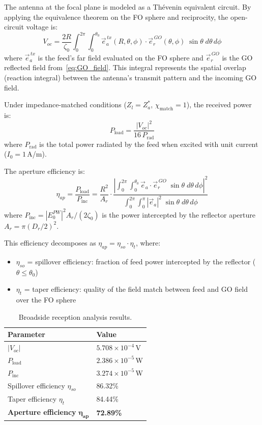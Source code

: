 \documentclass{article}
\begin{document}
The antenna at the focal plane is modeled as a Th\'{e}venin equivalent circuit. By applying the equivalence theorem on the FO sphere and reciprocity, the open-circuit voltage is:
\begin{equation}\label{eq:Voc}
V_{oc} = \frac{2R}{\zeta_0} \int_0^{2\pi}\!\int_0^{\theta_0} \vec{e}_a^{\,tx}(R,\theta,\phi) \cdot \vec{e}_r^{\,GO}(\theta,\phi)\;\sin\theta\;d\theta\,d\phi
\end{equation}
where $\vec{e}_a^{\,tx}$ is the feed's far field evaluated on the FO sphere and $\vec{e}_r^{\,GO}$ is the GO reflected field from~\eqref{eq:GO_field}. This integral represents the spatial overlap (reaction integral) between the antenna's transmit pattern and the incoming GO field.

Under impedance-matched conditions ($Z_l = Z_a^*$, $\chi_{\text{match}} = 1$), the received power is:
\begin{equation}\label{eq:Pload}
P_{\text{load}} = \frac{|V_{oc}|^2}{16\,P_{\text{rad}}}
\end{equation}
where $P_{\text{rad}}$ is the total power radiated by the feed when excited with unit current ($I_0 = 1$\,A/m).

The aperture efficiency is:
\begin{equation}\label{eq:eta_ap}
\eta_{ap} = \frac{P_{\text{load}}}{P_{\text{inc}}} = \frac{R^2}{A_r} \cdot \frac{\left|\displaystyle\int_0^{2\pi}\!\int_0^{\theta_0} \vec{e}_a \cdot \vec{e}_r^{\,GO}\;\sin\theta\;d\theta\,d\phi\right|^2}{\displaystyle\int_0^{2\pi}\!\int_0^{\pi} |\vec{e}_a|^2\;\sin\theta\;d\theta\,d\phi}
\end{equation}
where $P_{\text{inc}} = |E_0^{PW}|^2 A_r / (2\zeta_0)$ is the power intercepted by the reflector aperture $A_r = \pi(D_r/2)^2$.

This efficiency decomposes as $\eta_{ap} = \eta_{so} \cdot \eta_t$, where:
\begin{itemize}
\item $\eta_{so}$ = spillover efficiency: fraction of feed power intercepted by the reflector ($\theta \leq \theta_0$)
\item $\eta_t$ = taper efficiency: quality of the field match between feed and GO field over the FO sphere
\end{itemize}

\begin{table}[H]
\centering
\caption{Broadside reception analysis results.}
\label{tab:q13}
\begin{tabular}{@{}ll@{}}
\toprule
Parameter & Value \\
\midrule
$|V_{oc}|$ & $5.708 \times 10^{-4}$\,V \\
$P_{\text{load}}$ & $2.386 \times 10^{-5}$\,W \\
$P_{\text{inc}}$ & $3.274 \times 10^{-5}$\,W \\
\midrule
Spillover efficiency $\eta_{so}$ & 86.32\% \\
Taper efficiency $\eta_t$ & 84.44\% \\
\textbf{Aperture efficiency} $\boldsymbol{\eta_{ap}}$ & \textbf{72.89\%} \\
\bottomrule
\end{tabular}
\end{table}
\end{document}
